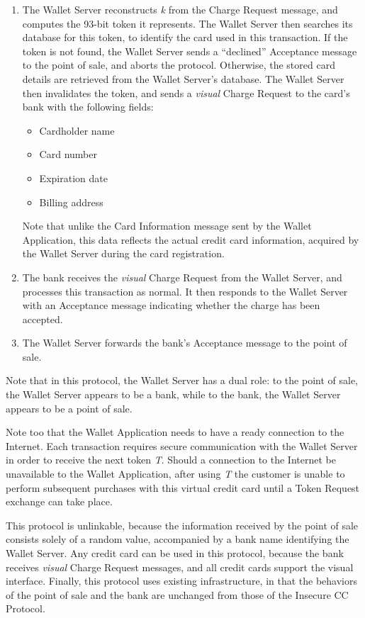 \begin{enumerate}
\item The Wallet Server reconstructs \emph{k} from the Charge Request message, and computes the 93-bit token it represents.
    The Wallet Server then searches its database for this token, to identify the card used in this transaction.
    If the token is not found, the Wallet Server sends a ``declined'' Acceptance message to the point of sale, and aborts the protocol.
    Otherwise, the stored card details are retrieved from the Wallet Server's database.
    The Wallet Server then invalidates the token, and sends a \emph{visual} Charge Request to the card's bank with the following fields:
    \begin{itemize}
    \item Cardholder name
    \item Card number
    \item Expiration date
    \item Billing address
    \end{itemize}
    Note that unlike the Card Information message sent by the Wallet Application, this data reflects the actual credit card information,
        acquired by the Wallet Server during the card registration.

\item The bank receives the \emph{visual} Charge Request from the Wallet Server, and processes this transaction as normal.
    It then responds to the Wallet Server with an Acceptance message indicating whether the charge has been accepted.

\item The Wallet Server forwards the bank's Acceptance message to the point of sale.
\end{enumerate}

Note that in this protocol, the Wallet Server has a dual role:
to the point of sale, the Wallet Server appears to be a bank, while to the bank, the Wallet Server appears to be a point of sale.

Note too that the Wallet Application needs to have a ready connection to the Internet.
Each transaction requires secure communication with the Wallet Server in order to receive the next token \emph{T}.
Should a connection to the Internet be unavailable to the Wallet Application,
    after using \emph{T} the customer is unable to perform subsequent purchases with this virtual credit card until a Token Request exchange can take place.

This protocol is unlinkable,
    because the information received by the point of sale consists solely of a random value, accompanied by a bank name identifying the Wallet Server.
Any credit card can be used in this protocol,
    because the bank receives \emph{visual} Charge Request messages, and all credit cards support the visual interface.
Finally, this protocol uses existing infrastructure,
    in that the behaviors of the point of sale and the bank are unchanged from those of the Insecure CC Protocol.
